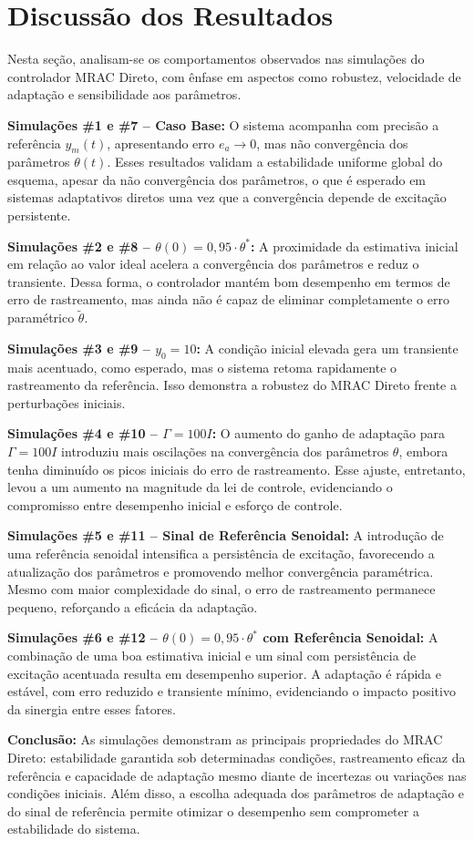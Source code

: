 \documentclass[10pt]{article}
\begin{document}
\newpage

\section{Discussão dos Resultados}

Nesta seção, analisam-se os comportamentos observados nas simulações do controlador MRAC Direto, com ênfase em aspectos como robustez, velocidade de adaptação e sensibilidade aos parâmetros.

\textbf{Simulações \#1 e \#7 – Caso Base:} O sistema acompanha com precisão a referência $y_m(t)$, apresentando erro $e_a \rightarrow 0$, mas não convergência dos parâmetros $\theta(t)$. Esses resultados validam a estabilidade uniforme global do esquema, apesar da não convergência dos parâmetros, o que é esperado em sistemas adaptativos diretos uma vez que a convergência depende de excitação persistente.

\textbf{Simulações \#2 e \#8 – $\theta(0) = 0{,}95 \cdot \theta^*$:} A proximidade da estimativa inicial em relação ao valor ideal acelera a convergência dos parâmetros e reduz o transiente. Dessa forma, o controlador mantém bom desempenho em termos de erro de rastreamento, mas ainda não é capaz de eliminar completamente o erro paramétrico $\tilde{\theta}$.

\textbf{Simulações \#3 e \#9 – $y_0 = 10$:} A condição inicial elevada gera um transiente mais acentuado, como esperado, mas o sistema retoma rapidamente o rastreamento da referência. Isso demonstra a robustez do MRAC Direto frente a perturbações iniciais.

\textbf{Simulações \#4 e \#10 – $\Gamma = 100I$:} O aumento do ganho de adaptação para $\Gamma = 100I$ introduziu mais oscilações na convergência dos parâmetros $\theta$, embora tenha diminuído os picos iniciais do erro de rastreamento. Esse ajuste, entretanto, levou a um aumento na magnitude da lei de controle, evidenciando o compromisso entre desempenho inicial e esforço de controle.

\textbf{Simulações \#5 e \#11 – Sinal de Referência Senoidal:} A introdução de uma referência senoidal intensifica a persistência de excitação, favorecendo a atualização dos parâmetros e promovendo melhor convergência paramétrica. Mesmo com maior complexidade do sinal, o erro de rastreamento permanece pequeno, reforçando a eficácia da adaptação.

\textbf{Simulações \#6 e \#12 – $\theta(0) = 0{,}95 \cdot \theta^*$ com Referência Senoidal:} A combinação de uma boa estimativa inicial e um sinal com persistência de excitação acentuada resulta em desempenho superior. A adaptação é rápida e estável, com erro reduzido e transiente mínimo, evidenciando o impacto positivo da sinergia entre esses fatores.

\textbf{Conclusão:} As simulações demonstram as principais propriedades do MRAC Direto: estabilidade garantida sob determinadas condições, rastreamento eficaz da referência e capacidade de adaptação mesmo diante de incertezas ou variações nas condições iniciais. Além disso, a escolha adequada dos parâmetros de adaptação e do sinal de referência permite otimizar o desempenho sem comprometer a estabilidade do sistema.
\end{document}
